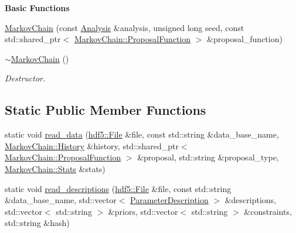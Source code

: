 \begin{Indent}{\bf Basic Functions}\par
{\em \label{_amgrp2386c9a1f1785edee33f374dd2db9b3d}
 }\begin{DoxyCompactItemize}
\item 
\hyperlink{classeos_1_1MarkovChain_a47726a7176a818738c426b532e88ba94}{MarkovChain} (const \hyperlink{classeos_1_1Analysis}{Analysis} \&analysis, unsigned long seed, const std::shared\_\-ptr$<$ \hyperlink{structeos_1_1MarkovChain_1_1ProposalFunction}{MarkovChain::ProposalFunction} $>$ \&proposal\_\-function)
\item 
\hyperlink{classeos_1_1MarkovChain_afc27e695a24e780cd1af87e454588f31}{$\sim$MarkovChain} ()
\begin{DoxyCompactList}\small\item\em Destructor. \item\end{DoxyCompactList}\end{DoxyCompactItemize}
\end{Indent}
\subsection*{Static Public Member Functions}
\begin{DoxyCompactItemize}
\item 
static void \hyperlink{classeos_1_1MarkovChain_a9d67db1a7839b07dc43a847b6383e619}{read\_\-data} (\hyperlink{classeos_1_1hdf5_1_1File}{hdf5::File} \&file, const std::string \&data\_\-base\_\-name, \hyperlink{structeos_1_1MarkovChain_1_1History}{MarkovChain::History} \&history, std::shared\_\-ptr$<$ \hyperlink{structeos_1_1MarkovChain_1_1ProposalFunction}{MarkovChain::ProposalFunction} $>$ \&proposal, std::string \&proposal\_\-type, \hyperlink{structeos_1_1MarkovChain_1_1Stats}{MarkovChain::Stats} \&stats)
\item 
static void \hyperlink{classeos_1_1MarkovChain_acbcd604ef986e97891f0e358e045c117}{read\_\-descriptions} (\hyperlink{classeos_1_1hdf5_1_1File}{hdf5::File} \&file, const std::string \&data\_\-base\_\-name, std::vector$<$ \hyperlink{structeos_1_1ParameterDescription}{ParameterDescription} $>$ \&descriptions, std::vector$<$ std::string $>$ \&priors, std::vector$<$ std::string $>$ \&constraints, std::string \&hash)
\end{DoxyCompactItemize}


